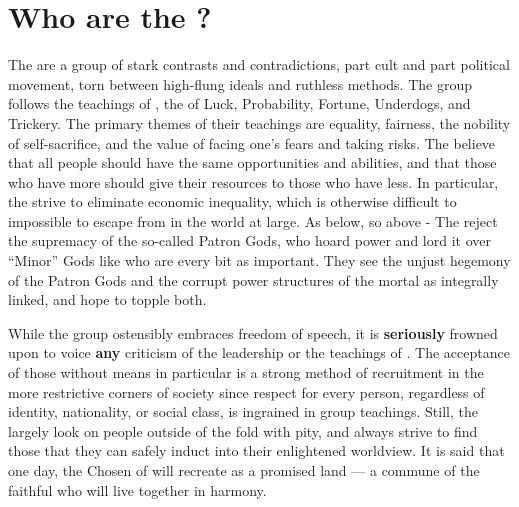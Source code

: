 \documentclass[blue]{GL2020}
\begin{document}
\name{\bCultAvenger{}}

\section*{Who are the \pGoaties{}?}
The \pGoaties{} are a group of stark contrasts and contradictions, part cult and part political movement, torn between high-flung ideals and ruthless methods. The group follows the teachings of \cGenesis{}, the \cGenesis{\Deity} of Luck, Probability, Fortune, Underdogs, and Trickery. The primary themes of their teachings are equality, fairness, the nobility of self-sacrifice, and the value of facing one's fears and taking risks. The \pGoaties{} believe that all people should have the same opportunities and abilities, and that those who have more should give their resources to those who have less. In particular, the \pGoaties{} strive to eliminate economic inequality, which is otherwise difficult to impossible to escape from in the world at large. As below, so above - The \pGoaties{} reject the supremacy of the so-called Patron Gods, who hoard power and lord it over “Minor” Gods like \cGenesis{} who are every bit as important. They see the unjust hegemony of the Patron Gods and the corrupt power structures of the mortal as integrally linked, and hope to topple both.

While the group ostensibly embraces freedom of speech, it is \textbf{seriously} frowned upon to voice \textbf{any} criticism of the leadership or the teachings of \cGenesis{}. The acceptance of those without means in particular is a strong method of recruitment in the more restrictive corners of society since respect for every person, regardless of identity, nationality, or social class, is ingrained in group teachings. Still, the \pGoaties{} largely look on people outside of the fold with pity, and always strive to find those that they can safely induct into their enlightened worldview. It is said that one day, the Chosen of \cGenesis{} will recreate \pEarth{} as a promised land — a commune of the faithful who will live together in harmony.
\end{document}

